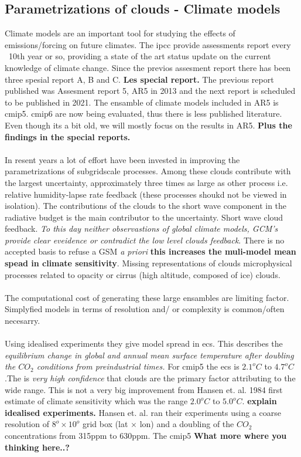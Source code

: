 \subsection{Parametrizations of clouds - Climate models} \label{sec:params_climate_models}
Climate models are an important tool for studying the effects of emissions/forcing on future climates. The \acrfull{ipcc} provide assessments report every ~10th year or so, providing a state of the art status update on the current knowledge of climate change. Since the previos assesment report there has been three spesial report A, B and C. 
\textbf{Les special report.} The previous report published was Assesment report 5, AR5 in 2013 and the next report is scheduled to be published in 2021. 
The ensamble of climate models included in AR5 is \acrfull{cmip5}. 
\acrshort{cmip6} are now being evaluated, thus there is less published literature. Even though its a bit old, we will mostly focus on the results in AR5. \textbf{Plus the findings in the special reports.}
\\ \\
In resent years a lot of effort have been invested in improving the parametrizations of subgridscale processes. Among these clouds contribute with the largest uncertainty, approximately three times as large as other process i.e. relative humidity-lapse rate feedback (these processes shoukd not be viewed in isolation). The contributions of the clouds to the short wave component in the radiative budget is the main contributor to the uncertainty. Short wave cloud feedback. \textit{To this day neither observastions of global climate models, GCM's provide clear eveidence or contradict the low level clouds feedback}. There is no accepted basis to refuse a GSM \textit{a priori} \textbf{this increases the muli-model mean spead in climate sensitivity}. Missing representations of clouds microphysical processes related to opacity or cirrus (high altitude, composed of ice) clouds.
\\ \\
The computational cost of generating these large ensambles are limiting factor. Simplyfied models in terms of resolution and/ or complexity is common/often necesarry. 
\\ \\ 
Using idealised experiments they give model spread in \acrfull{ecs}. This describes the \textit{equilibrium change in global and annual mean surface temperature after doubling the $CO_2$ conditions from preindustrial times.}
For \acrshort{cmip5} the \acrshort{ecs} is $2.1^oC$ to $4.7^oC$.The is \textit{very high confidence} that clouds are the primary factor attributing to the wide range. This is not a very big improvement from Hansen et. al. 1984 first estimate of climate sensitivity which was the range $2.0^oC$ to $5.0^oC$. \textbf{explain idealised experiments.} Hansen et. al. ran their experiments using a coarse resolution of $8^o \times 10^o$ grid box (lat $\times$ lon) and a doubling of the $CO_2$ concentrations from 315ppm to 630ppm. The \acrshort{cmip5} \textbf{What more where you thinking here..?}


